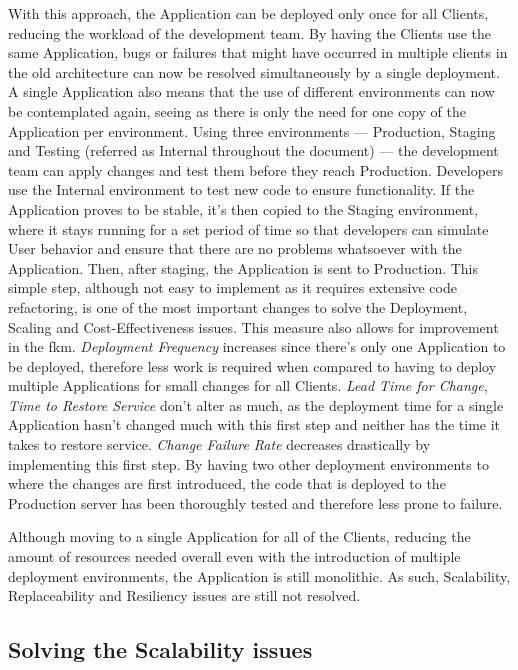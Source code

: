 

With this approach, the Application can be deployed only once for all Clients, reducing the workload of the development team. By having the Clients use the same Application, bugs or failures that might have occurred in multiple clients in the old architecture can now be resolved simultaneously by a single deployment. A single Application also means that the use of different environments can now be contemplated again, seeing as there is only the need for one copy of the Application per environment. Using three environments --- Production, Staging and Testing (referred as Internal throughout the document) --- the development team can apply changes and test them before they reach Production. Developers use the Internal environment to test new code to ensure functionality. If the Application proves to be stable, it's then copied to the Staging environment, where it stays running for a set period of time so that developers can simulate User behavior and ensure that there are no problems whatsoever with the Application. Then, after staging, the Application is sent to Production.
This simple step, although not easy to implement as it requires extensive code refactoring, is one of the most important changes to solve the Deployment, Scaling and Cost-Effectiveness issues. This measure also allows for improvement in the \gls{fkm}. \textit{Deployment Frequency} increases since there's only one Application to be deployed, therefore less work is required when compared to having to deploy multiple Applications for small changes for all Clients. \textit{Lead Time for Change}, \textit{Time to Restore Service} don't alter as much, as the deployment time for a single Application hasn't changed much with this first step and neither has the time it takes to restore service. \textit{Change Failure Rate} decreases drastically by implementing this first step. By having two other deployment environments to where the changes are first introduced, the code that is deployed to the Production server has been thoroughly tested and therefore less prone to failure.

Although moving to a single Application for all of the Clients, reducing the amount of resources needed overall even with the introduction of multiple deployment environments, the Application is still monolithic. As such, Scalability, Replaceability and Resiliency issues are still not resolved.

\subsection{Solving the Scalability issues}\label{methodology:ss:solving-the-scalability-issues}

